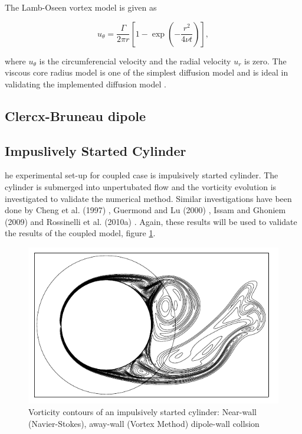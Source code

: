 The Lamb-Oseen vortex model is given as

\begin{equation}
u_{\theta} = \frac{\Gamma}{2\pi r}\left[1-\exp\left(-\frac{r^2}{4\nu t}\right)\right],
\end{equation}

where $u_{\theta}$ is the circumferencial velocity and the radial velocity $u_r$ is zero. The viscous core radius model is one of the simplest diffusion model and is ideal in validating the implemented diffusion model \cite{Tryggeson2007}.

\subsection{Clercx-Bruneau dipole}



\subsection{Impuslively Started Cylinder}

he experimental set-up for coupled case is impulsively started cylinder. The cylinder is submerged into unpertubated flow and the vorticity evolution is investigated to validate the numerical method. Similar investigations have been done by Cheng et al. (1997) \cite{Cheng1997}, Guermond and Lu (2000) \cite{Guermond2000}, Issam and Ghoniem (2009) \cite{Lakkis2009} and Rossinelli et al. (2010a) \cite{Rossinelli2010a}. Again, these results will be used to validate the results of the coupled model, figure \ref{fig:ISC}.

\begin{figure}[h]
\centering
\includegraphics[width=0.6\linewidth]{figures/introduction/ISC}
\caption{Vorticity contours of an impulsively started cylinder: Near-wall (Navier-Stokes), away-wall (Vortex Method) dipole-wall collsion \cite{Daeninck2006}}
\label{fig:ISC}
\end{figure}



